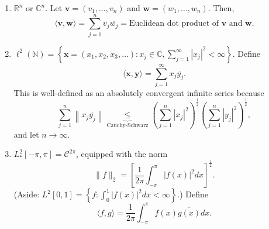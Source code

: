 \documentclass[letterpaper, reqno,11pt]{article}
\newcommand{\RR}{\mathbb{R}}
\newcommand{\CC}{\mathbb{C}}
\newcommand{\NN}{\mathbb{N}}
\begin{document}
\begin{enumerate}
\item $\RR^n$ or $\CC^n$. Let $\mathbf v = (v_1, \ldots, v_n)$ and $\mathbf w = (w_1, \ldots, w_n)$. Then,
  \[ \langle \mathbf v, \mathbf w \rangle = \sum_{j = 1}^n v_j \overline{w_j} = \text{Euclidean dot product of $\mathbf v$ and $\mathbf w$}. \]
\item $\ell^2(\NN) = \left\{ \mathbf x = (x_1, x_2, x_3, \ldots) : x_j \in \CC, \sum_{j = 1}^\infty |x_j|^2 < \infty \right\}$. Define
  \[ \langle \mathbf x, \mathbf y \rangle = \sum_{j = 1}^\infty x_j \overline{y_j}. \]
  This is well-defined as an absolutely convergent infinite series because
  \[ \sum_{j = 1}^n \left\lVert x_j \overline{y_j} \right\rVert \underbrace{\leq}_\text{Cauchy-Schwarz} \left(\sum_{j = 1}^n |x_j|^2\right)^\frac{1}{2} \left(\sum_{j = 1}^n |y_j|^2\right)^\frac{1}{2}, \]
  and let $n \to \infty$.
\item $L_*^2[-\pi, \pi] = \mathcal C^{2\pi}$, equipped with the norm
  \[ \lVert f \rVert_2 = \left[\frac{1}{2\pi} \int_{-\pi}^\pi |f(x)|^2 dx\right]^\frac{1}{2}. \]
  (Aside: $L^2[0, 1] = \left\{ f : \int_0^1 |f(x)|^2 dx < \infty \right\}$.)
  Define
  \[ \langle f, g \rangle = \frac{1}{2\pi} \int_{-\pi}^\pi f(x) \overline{g(x)} dx. \]
\end{enumerate}

\begin{figure}[H]
  \centering
\end{figure}
\end{document}
